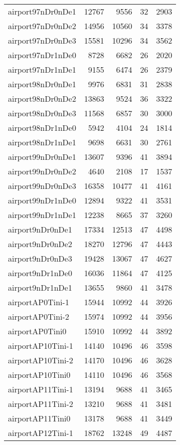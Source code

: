 \begin{longtable}{lrrrr}
airport97nDr0nDe1 & 12767 & 9556 & 32 & 2903 \\
airport97nDr0nDe2 & 14956 & 10560 & 34 & 3378 \\
airport97nDr0nDe3 & 15581 & 10296 & 34 & 3562 \\
airport97nDr1nDe0 & 8728 & 6682 & 26 & 2020 \\
airport97nDr1nDe1 & 9155 & 6474 & 26 & 2379 \\
airport98nDr0nDe1 & 9976 & 6831 & 31 & 2838 \\
airport98nDr0nDe2 & 13863 & 9524 & 36 & 3322 \\
airport98nDr0nDe3 & 11568 & 6857 & 30 & 3000 \\
airport98nDr1nDe0 & 5942 & 4104 & 24 & 1814 \\
airport98nDr1nDe1 & 9698 & 6631 & 30 & 2761 \\
airport99nDr0nDe1 & 13607 & 9396 & 41 & 3894 \\
airport99nDr0nDe2 & 4640 & 2108 & 17 & 1537 \\
airport99nDr0nDe3 & 16358 & 10477 & 41 & 4161 \\
airport99nDr1nDe0 & 12894 & 9322 & 41 & 3531 \\
airport99nDr1nDe1 & 12238 & 8665 & 37 & 3260 \\
airport9nDr0nDe1 & 17334 & 12513 & 47 & 4498 \\
airport9nDr0nDe2 & 18270 & 12796 & 47 & 4443 \\
airport9nDr0nDe3 & 19428 & 13067 & 47 & 4627 \\
airport9nDr1nDe0 & 16036 & 11864 & 47 & 4125 \\
airport9nDr1nDe1 & 13655 & 9860 & 41 & 3478 \\
airportAP0Tini-1 & 15944 & 10992 & 44 & 3926 \\
airportAP0Tini-2 & 15974 & 10992 & 44 & 3956 \\
airportAP0Tini0 & 15910 & 10992 & 44 & 3892 \\
airportAP10Tini-1 & 14140 & 10496 & 46 & 3598 \\
airportAP10Tini-2 & 14170 & 10496 & 46 & 3628 \\
airportAP10Tini0 & 14110 & 10496 & 46 & 3568 \\
airportAP11Tini-1 & 13194 & 9688 & 41 & 3465 \\
airportAP11Tini-2 & 13210 & 9688 & 41 & 3481 \\
airportAP11Tini0 & 13178 & 9688 & 41 & 3449 \\
airportAP12Tini-1 & 18762 & 13248 & 49 & 4487 \\

\end{longtable}
